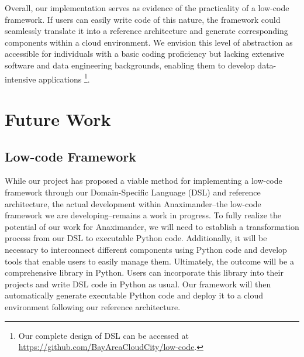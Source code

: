 Overall, our implementation serves as evidence of the practicality of a low-code framework. If users can easily write code of this nature, the framework could seamlessly translate it into a reference architecture and generate corresponding components within a cloud environment. We envision this level of abstraction as accessible for individuals with a basic coding proficiency but lacking extensive software and data engineering backgrounds, enabling them to develop data-intensive applications \footnote{Our complete design of DSL can be accessed at \url{https://github.com/BayAreaCloudCity/low-code}.}.


\section{Future Work}
\subsection{Low-code Framework}

While our project has proposed a viable method for implementing a low-code framework through our Domain-Specific Language (DSL) and reference architecture, the actual development within Anaximander--the low-code framework we are developing--remains a work in progress. To fully realize the potential of our work for Anaximander, we will need to establish a transformation process from our DSL to executable Python code. Additionally, it will be necessary to interconnect different components using Python code and develop tools that enable users to easily manage them. Ultimately, the outcome will be a comprehensive library in Python. Users can incorporate this library into their projects and write DSL code in Python as usual. Our framework will then automatically generate executable Python code and deploy it to a cloud environment following our reference architecture.

